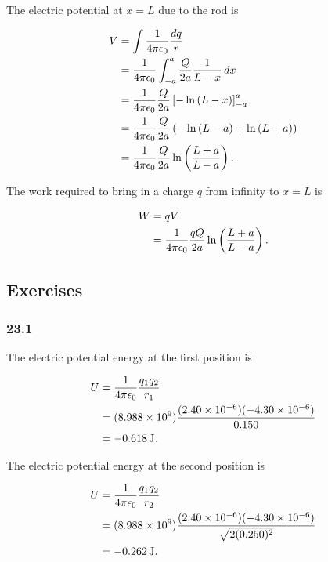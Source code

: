 \documentclass{article}
\begin{document}
The electric potential at $x = L$ due to the rod is

\begin{align*}
  V & = \int \frac{1}{4 \pi \epsilon_0} \frac{dq}{r}                                                                 \\
    & = \frac{1}{4 \pi \epsilon_0} \int_{-a}^a \frac{Q}{2 a} \frac{1}{L - x} \,dx                                    \\
    & = \frac{1}{4 \pi \epsilon_0} \frac{Q}{2 a} \left[ -\ln \left( L - x \right) \right]_{-a}^a                     \\
    & = \frac{1}{4 \pi \epsilon_0} \frac{Q}{2 a} \left( -\ln \left( L - a \right) + \ln \left( L + a \right) \right) \\
    & = \frac{1}{4 \pi \epsilon_0} \frac{Q}{2 a} \ln \left( \frac{L + a}{L - a} \right).
\end{align*}

The work required to bring in a charge $q$ from infinity to $x = L$ is

\begin{align*}
  W & = q V                                                        \\
    & = \frac{1}{4 \pi \epsilon_0} \frac{qQ}{2 a} \ln \left( \frac{L + a}{L - a} \right).
\end{align*}

\subsection{Exercises}

\subsubsection{23.1}

The electric potential energy at the first position is

\begin{align*}
  U & = \frac{1}{4 \pi \epsilon_0} \frac{q_1 q_2}{r_1}                                        \\
    & = (\num{8.988e9}) \frac{(\num{2.40e-6}) (\num{-4.30e-6})}{0.150} \\
    & = \qty{-0.618}{J}.
\end{align*}

The electric potential energy at the second position is

\begin{align*}
  U & = \frac{1}{4 \pi \epsilon_0} \frac{q_1 q_2}{r_2}                                                     \\
    & = (\num{8.988e9}) \frac{(\num{2.40e-6}) (\num{-4.30e-6})}{\sqrt{2 (0.250)^2}} \\
    & = \qty{-0.262}{J}.
\end{align*}
\end{document}

